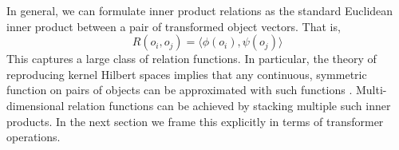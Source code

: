 In general, we can formulate inner product relations as the standard Euclidean inner product between a pair of transformed object vectors. That is, 
\begin{equation}
    R(o_i, o_j) = \langle \phi(o_i), \psi(o_j) \rangle
    \label{eq:relation_innerproduct}
\end{equation}
This captures a large class of relation functions. In particular, the theory of reproducing kernel Hilbert spaces implies that any continuous, symmetric function on pairs of objects can be approximated with such functions
\citep{universal}. Multi-dimensional relation functions can be achieved by stacking multiple such inner products.
In the next section we frame this explicitly in terms of transformer operations.




% 
